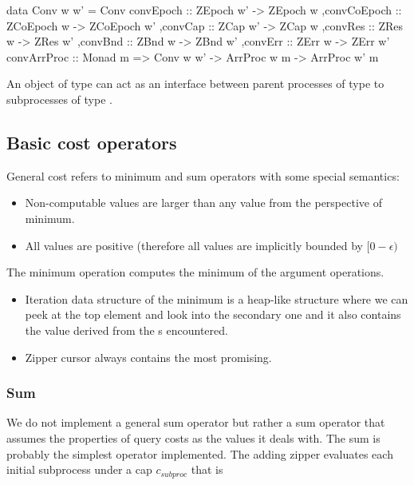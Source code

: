 \begin{code}
\begin{haskellcode}
data Conv w w' =
  Conv
  { convEpoch :: ZEpoch w' -> ZEpoch w
   ,convCoEpoch :: ZCoEpoch w -> ZCoEpoch w'
   ,convCap :: ZCap w' -> ZCap w
   ,convRes :: ZRes w -> ZRes w'
   ,convBnd :: ZBnd w -> ZBnd w'
   ,convErr :: ZErr w -> ZErr w'
  }
convArrProc :: Monad m => Conv w w' -> ArrProc w m -> ArrProc w' m
\end{haskellcode}
\label{lst:conv_def}
\caption{An object of type  can act as an interface
  between parent processes of type  to subprocesses of type
  .}
\end{code}


\subsection{Basic cost operators}
\label{sec:basic_cost_ops}

General cost refers to minimum and sum operators with some special
semantics:

\begin{itemize}
\item Non-computable values are larger than any value from the
  perspective of minimum.
\item All values are positive (therefore all values are implicitly
  bounded by \([0 - \epsilon)\)
\end{itemize}

The minimum operation computes the minimum of the argument
operations.

\begin{itemize}
\item Iteration data structure of the minimum is a heap-like structure
  where we can peek at the top element and look into the secondary one
  and it also contains the value derived from the s encountered.
\item Zipper cursor always contains the most promising.
\end{itemize}

\subsubsection{Sum}

We do not implement a general sum operator but rather a sum operator
that assumes the properties of query costs as the values it deals
with. The sum is probably the simplest operator implemented. The
adding zipper evaluates each initial subprocess under a cap
\(c_{subproc}\) that is

